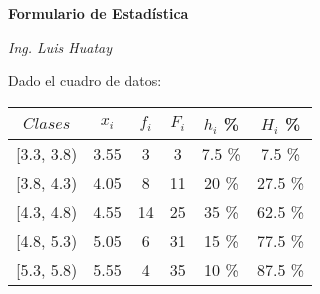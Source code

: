\documentclass[11pt, a4paper]{article}
\newenvironment{tablaDeEjemplo}{}{}
\begin{document}

\textbf{\large{Formulario de Estadística}}
\hfill
\begin{minipage}[t]{3cm}
    \centering 
    \textit{Ing. Luis Huatay}
\end{minipage}
\begin{multicols}{2}
    \begin{tablaDeEjemplo}
        Dado el cuadro de datos:
        \begin{center}
            \begin{tabular}{|c|c|c|c|c|c|}
                \hline
                $Clases$ & $x_i$ & $f_i$ & $F_i$ & $h_i$ \% & $H_i$ \% \\
                \hline
                [3.3, 3.8) & 3.55 & 3  & 3  & 7.5 \%  & 7.5 \%  \\
    
                [3.8, 4.3) & 4.05 & 8  & 11 & 20 \%   & 27.5 \% \\
    
                [4.3, 4.8) & 4.55 & 14 & 25 & 35 \%   & 62.5 \% \\
    
                [4.8, 5.3) & 5.05 & 6  & 31 & 15 \%   & 77.5 \% \\
    
                [5.3, 5.8) & 5.55 & 4  & 35 & 10 \%   & 87.5 \% \\
    

\end{tabular}
\end{center}
\end{tablaDeEjemplo}
\end{multicols}
\end{document}
